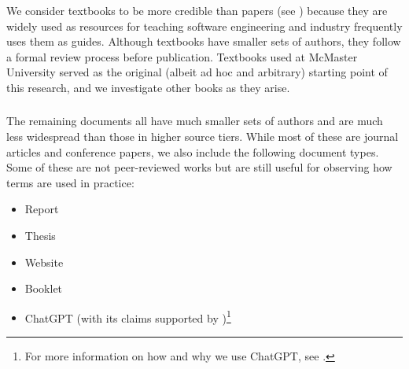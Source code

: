 \subsubsection{}\label{texts}

We consider textbooks to be more credible than papers (see )
because they are widely used as resources for teaching software engineering and
industry frequently uses them as guides. Although textbooks have smaller sets of
authors, they follow a formal review process before publication. Textbooks used
at McMaster University \citep{Patton2006,PetersAndPedrycz2000,vanVliet2000}
served as the original (albeit ad hoc and arbitrary) starting point of this
research, and we investigate other books as they arise. \addTextEx{}

\subsubsection{}\label{papers}

The remaining documents all have much smaller sets of authors and are much less
widespread than those in higher source tiers. While most of these are journal
articles and conference papers, we also include the following document types.
Some of these are not peer-reviewed works but are still useful for
observing how terms are used in practice:

\begin{itemize}
    \item Report \citep{Kam2008,Gerrard2000a,Gerrard2000b}
    \item Thesis \citep{Bas2024}
    \item Website \citep{LambdaTest2024,Pandey2023}
    \item Booklet \citep{SPICE2022}
    \item \ifnotpaper \else ChatGPT \fi \citet{ChatGPT2024} (with its claims
          supported by \citet{RusEtAl2008})\ifnotpaper\footnote{For more
                  information on how and why we use ChatGPT, see
                  .}\fi
\end{itemize}
